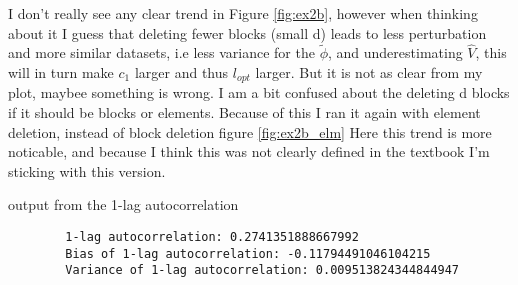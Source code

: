 \documentclass[a4paper,12pt]{article}
\theoremstyle{breaktheorem}
\theoremstyle{exerciseStyle}
\theoremstyle{solutionStyle}
\begin{document}
\begin{enumerate}
          I don't really see any clear trend in Figure \ref{fig:ex2b}, however when thinking about it I guess that deleting fewer blocks (small d) leads to less
          perturbation and more similar datasets, i.e less variance for the $\tilde{\phi}$, and underestimating
          $\hat V$, this will in turn make $c_1$ larger and thus $l_{opt}$ larger.
          But it is not as clear from my plot, maybee something is wrong. I am a bit confused about the
          deleting d blocks if it should be blocks or elements. Because of this I ran it again with element
          deletion, instead of block deletion figure \ref{fig:ex2b_elm}
          Here this trend is more noticable, and because I think this was not clearly defined in the textbook I'm
          sticking with this version.

          output from the 1-lag autocorrelation
          \begin{verbatim}
        1-lag autocorrelation: 0.2741351888667992
        Bias of 1-lag autocorrelation: -0.11794491046104215
        Variance of 1-lag autocorrelation: 0.009513824344844947
            \end{verbatim}
\end{enumerate}
\end{document}
